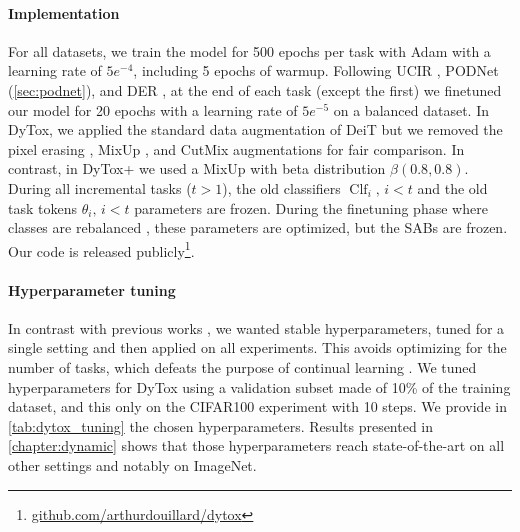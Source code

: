 \paragraph{Implementation} For all datasets, we train the model for 500 epochs per task with Adam
\citep{kingma2014adam} with a learning rate of $5e^{-4}$, including 5 epochs of warmup. Following
UCIR \citep{hou2019ucir}, PODNet (\autoref{sec:podnet}), and DER \citep{yan2021der}, at the end of
each task (except the first) we finetuned our model for 20 epochs with a learning rate of $5e^{-5}$
on a balanced dataset. In DyTox, we applied the standard data augmentation of DeiT
\citep{touvron2021deit} but we removed the pixel erasing \citep{zhong2017erasing}, MixUp
\citep{hingyi2018mixup}, and CutMix \citep{yun2019cutmix} augmentations for fair comparison. In
contrast, in DyTox+ we used a MixUp \citep{hingyi2018mixup} with beta distribution $\beta(0.8,
    0.8)$. During all incremental tasks ($t>1$), the old classifiers $\operatorname{Clf}_i,\, i < t$ and
the old task tokens $\theta_i,\, i < t$ parameters are frozen. During the finetuning phase where
classes are rebalanced \citep{castro2018end_to_end_inc_learn,hou2019ucir,yan2021der}, these
parameters are optimized, but the SABs are frozen. Our code is released
publicly\footnote{\href{https://github.com/arthurdouillard/dytox}{\scriptsize{github.com/arthurdouillard/dytox}}}.


\paragraph{Hyperparameter tuning} In contrast with previous works \citep{yan2021der}, we wanted
stable hyperparameters, tuned for a single setting and then applied on all experiments. This avoids
optimizing for the number of tasks, which defeats the purpose of continual learning
\citep{farquhar2018robustcontinual}. We tuned hyperparameters for DyTox using a validation subset
made of 10\% of the training dataset, and this only on the CIFAR100 experiment with 10 steps. We
provide in \autoref{tab:dytox_tuning} the chosen hyperparameters. Results presented in
\autoref{chapter:dynamic} shows that those hyperparameters reach state-of-the-art on all other
settings and notably on ImageNet.




